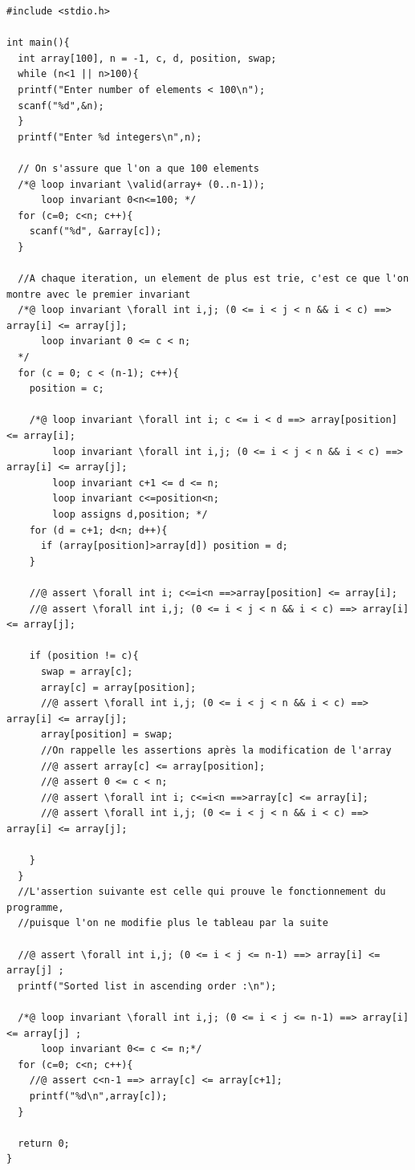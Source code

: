 \documentclass{scrreprt}
\begin{document}
\begin{lstlisting}
#include <stdio.h>

int main(){
  int array[100], n = -1, c, d, position, swap;
  while (n<1 || n>100){
  printf("Enter number of elements < 100\n");
  scanf("%d",&n);
  }
  printf("Enter %d integers\n",n);

  // On s'assure que l'on a que 100 elements
  /*@ loop invariant \valid(array+ (0..n-1));
      loop invariant 0<n<=100; */
  for (c=0; c<n; c++){
    scanf("%d", &array[c]);
  }

  //A chaque iteration, un element de plus est trie, c'est ce que l'on montre avec le premier invariant
  /*@ loop invariant \forall int i,j; (0 <= i < j < n && i < c) ==> array[i] <= array[j];
      loop invariant 0 <= c < n;
  */
  for (c = 0; c < (n-1); c++){
    position = c;

    /*@ loop invariant \forall int i; c <= i < d ==> array[position] <= array[i];
        loop invariant \forall int i,j; (0 <= i < j < n && i < c) ==> array[i] <= array[j];
        loop invariant c+1 <= d <= n;
        loop invariant c<=position<n;
        loop assigns d,position; */
    for (d = c+1; d<n; d++){
      if (array[position]>array[d]) position = d;
    }

    //@ assert \forall int i; c<=i<n ==>array[position] <= array[i];
    //@ assert \forall int i,j; (0 <= i < j < n && i < c) ==> array[i] <= array[j];

    if (position != c){
      swap = array[c];
      array[c] = array[position];
      //@ assert \forall int i,j; (0 <= i < j < n && i < c) ==> array[i] <= array[j];
      array[position] = swap;
      //On rappelle les assertions après la modification de l'array
      //@ assert array[c] <= array[position];
      //@ assert 0 <= c < n;
      //@ assert \forall int i; c<=i<n ==>array[c] <= array[i];
      //@ assert \forall int i,j; (0 <= i < j < n && i < c) ==> array[i] <= array[j];

    }
  }
  //L'assertion suivante est celle qui prouve le fonctionnement du programme,
  //puisque l'on ne modifie plus le tableau par la suite

  //@ assert \forall int i,j; (0 <= i < j <= n-1) ==> array[i] <= array[j] ;
  printf("Sorted list in ascending order :\n");

  /*@ loop invariant \forall int i,j; (0 <= i < j <= n-1) ==> array[i] <= array[j] ;
      loop invariant 0<= c <= n;*/
  for (c=0; c<n; c++){
    //@ assert c<n-1 ==> array[c] <= array[c+1];
    printf("%d\n",array[c]);
  }

  return 0;
}
\end{lstlisting}
%
%
%
\end{document}
